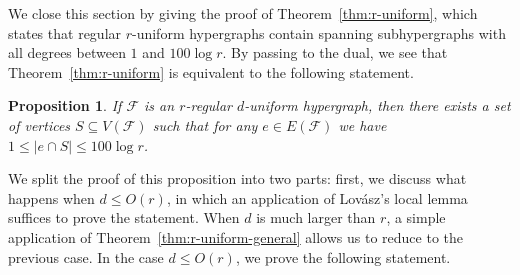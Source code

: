 \documentclass[11pt, a4paper]{article}
\numberwithin{theorem}{section} %
\newtheorem{proposition}[theorem]{Proposition}
\theoremstyle{remark}
\theoremstyle{definition}
\def\cF{\mathcal{F}}
\begin{document}
We close this section by giving the proof of Theorem~\ref{thm:r-uniform}, which states that regular $r$-uniform hypergraphs contain spanning subhypergraphs with all degrees between $1$ and $100\log r$. By passing to the dual, we see that Theorem~\ref{thm:r-uniform} is equivalent to the following statement. 
\begin{proposition}\label{prop:dual_problem}
If $\cF$ is an $r$-regular $d$-uniform hypergraph, then there exists a set of vertices $S\subseteq V(\cF)$ such that for any $e\in E(\cF)$ we have $1\leq |e\cap S|\leq 100\log r$.
\end{proposition}

We split the proof of this proposition into two parts: first, we discuss what happens when $d\leq O(r)$, in which an application of Lov\'asz's local lemma \cite{ErdosLovasz75} suffices to prove the statement. When $d$ is much larger than $r$, a simple application of Theorem~\ref{thm:r-uniform-general} allows us to reduce to the previous case. In the case $d\leq O(r)$, we prove the following statement.
\end{document}
